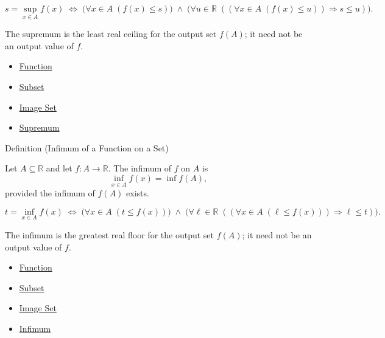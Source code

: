 \begin{remark*}
\[
  s=\sup_{x\in A}f(x)
  \;\Longleftrightarrow\;
  \bigl(\forall x\in A\;(f(x)\leq s)\bigr)
  \;\wedge\;
  \bigl(\forall u\in\mathbb{R}\;((\forall x\in A\;(f(x)\leq u))\Rightarrow s\leq u)\bigr).
\]
\end{remark*}

\begin{remark*}[Interpretation]
The supremum is the least real ceiling for the output set $f(A)$; it need
not be an output value of $f$.
\end{remark*}

\begin{dependencies}
\begin{itemize}
  \item \hyperref[def:function]{Function}
  \item \hyperref[def:subset]{Subset}
  \item \hyperref[def:image-set]{Image Set}
  \item \hyperref[def:supremum]{Supremum}
\end{itemize}
\end{dependencies}

\begin{definitionbox}{Definition (Infimum of a Function on a Set)}
\begin{definition}
\label{def:function-infimum-on-set}
Let $A\subseteq\mathbb{R}$ and let $f:A\to\mathbb{R}$.  The infimum of
$f$ on $A$ is
\[
  \inf_{x\in A} f(x) = \inf f(A),
\]
provided the infimum of $f(A)$ exists.
\end{definition}
\end{definitionbox}

\begin{remark*}
\[
  t=\inf_{x\in A}f(x)
  \;\Longleftrightarrow\;
  \bigl(\forall x\in A\;(t\leq f(x))\bigr)
  \;\wedge\;
  \bigl(\forall \ell\in\mathbb{R}\;((\forall x\in A\;(\ell\leq f(x)))\Rightarrow \ell\leq t)\bigr).
\]
\end{remark*}

\begin{remark*}[Interpretation]
The infimum is the greatest real floor for the output set $f(A)$; it need
not be an output value of $f$.
\end{remark*}

\begin{dependencies}
\begin{itemize}
  \item \hyperref[def:function]{Function}
  \item \hyperref[def:subset]{Subset}
  \item \hyperref[def:image-set]{Image Set}
  \item \hyperref[def:infimum]{Infimum}
\end{itemize}
\end{dependencies}

